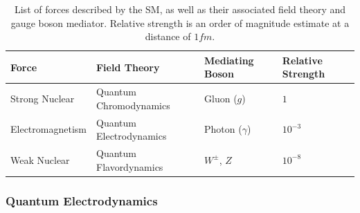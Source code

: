         \begin{table}[!ht]
            \begin{tabular}{l|l|l|l}
            Force & Field Theory & Mediating Boson & Relative Strength      \\ \hline
            Strong Nuclear   & Quantum Chromodynamics  & Gluon ($g$) & $1$ \\
            Electromagnetism & Quantum Electrodynamics & Photon ($\gamma$) & $10^{-3}$ \\
            Weak Nuclear     & Quantum Flavordynamics  & $W^{\pm}$, $Z$ & $10^{-8}$
            \end{tabular}
            \caption{List of forces described by the \gls{SM}, as well as their associated field theory and gauge boson mediator. Relative strength is an order of magnitude estimate at a distance of $\unit{1}{fm}$.}
            \label{tab:forces}
        \end{table}


        \subsubsection{Quantum Electrodynamics}

